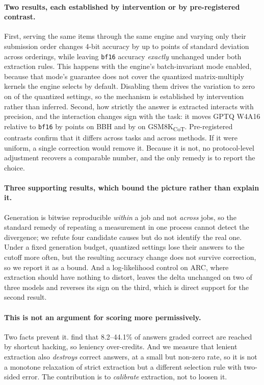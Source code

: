 \documentclass[conference]{IEEEtran}
\begin{document}
\paragraph{Two results, each established by intervention or by pre-registered contrast.}
First, serving the same items through the same engine and varying only their submission
order changes 4-bit accuracy by up to \hEightWorstSDTen{} points of standard deviation
across \hEightSDOrderings{} orderings, while leaving \texttt{bf16} accuracy \emph{exactly}
unchanged under both extraction rules. This happens with the engine's batch-invariant mode
enabled, because that mode's guarantee does not cover the quantized matrix-multiply kernels
the engine selects by default. Disabling them drives the variation to zero on
\hEightPinned{} of the quantized settings, so the mechanism is established by intervention
rather than inferred. Second, how strictly the answer is extracted interacts with
precision, and the interaction changes sign with the task: it moves GPTQ W4A16 relative to
\texttt{bf16} by \hThreeBbhGptqFour{} points on BBH and by \hThreeGsmGptqFour{} on
GSM8K\textsubscript{CoT}. Pre-registered contrasts confirm that it differs across tasks and
across methods. If it were uniform, a single correction would remove it. Because it is not,
no protocol-level adjustment recovers a comparable number, and the only remedy is to report
the choice.

\paragraph{Three supporting results, which bound the picture rather than explain it.}
Generation is bitwise reproducible \emph{within} a job and not \emph{across} jobs, so the
standard remedy of repeating a measurement in one process cannot detect the divergence; we
refute four candidate causes but do not identify the real one. Under a fixed generation
budget, quantized settings lose their answers to the cutoff more often, but the resulting
accuracy change does not survive correction, so we report it as a bound. And a
log-likelihood control on ARC, where extraction should have nothing to distort, leaves the
delta unchanged on two of three models and reverses its sign on the third, which is direct
support for the second result.

\paragraph{This is not an argument for scoring more permissively.}
Two facts prevent it. \citet{ren2026shortcut} find that 8.2--44.1\% of answers
graded correct are reached by shortcut hacking, so leniency over-credits. And we
measure that lenient extraction also \emph{destroys} correct answers, at a small
but non-zero rate, so it is not a monotone relaxation of strict extraction but a
different selection rule with two-sided error. The contribution is to
\emph{calibrate} extraction, not to loosen it.
\end{document}

